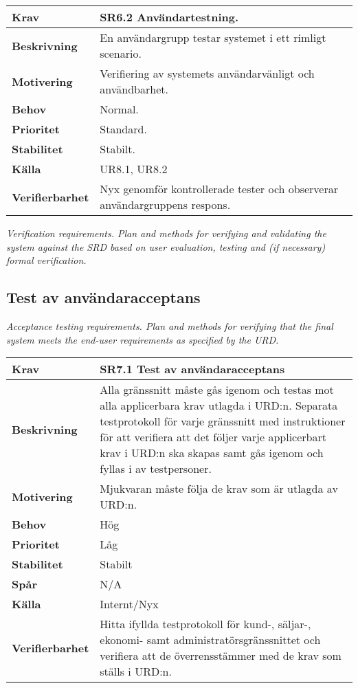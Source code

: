 \documentclass[a4paper, twoside, 11pt, titlepage]{article}
\begin{document}
\begin{tabular} { p{2.6cm} p{12.5cm} }
	\hline
	\sffamily\textbf{Krav} & \sffamily\textbf{SR6.2 Användartestning. } \\
	\hline
	\sffamily\textbf{Beskrivning} &  En användargrupp testar systemet i ett rimligt scenario.  \\
	\hline
	\sffamily\textbf{Motivering} &  Verifiering av systemets användarvänligt och användbarhet.  \\
	\hline
	\sffamily\textbf{Behov} &  Normal.  \\
	\hline
	\sffamily\textbf{Prioritet} &  Standard.  \\
	\hline
	\sffamily\textbf{Stabilitet} &  Stabilt.  \\
	\hline
	\sffamily\textbf{Källa} &  UR8.1, UR8.2  \\
	\hline
	\sffamily\textbf{Verifierbarhet} &  Nyx genomför kontrollerade tester och observerar användargruppens respons.  \\
	\hline
\end{tabular}
\vspace{6mm}

\emph{Verification requirements. Plan and methods for verifying and validating the system against the SRD based on user evaluation, testing and (if necessary) formal verification.}

	\subsection{Test av användaracceptans}


	\emph{Acceptance testing requirements. Plan and methods for verifying that the final system meets the end-user requirements as specified by the URD.}

	\begin{tabular} { p{2.6cm} p{12.5cm} }
		\hline
		\sffamily\textbf{Krav} & \sffamily\textbf{SR7.1 Test av användaracceptans } \\
		\hline
		\sffamily\textbf{Beskrivning} & Alla gränssnitt måste gås igenom och testas mot alla applicerbara krav utlagda i URD:n. Separata testprotokoll för varje gränssnitt med instruktioner för att verifiera att det följer varje applicerbart krav i URD:n ska skapas samt gås igenom och fyllas i av testpersoner.  \\
		\hline
		\sffamily\textbf{Motivering} & Mjukvaran måste följa de krav som är utlagda av URD:n.  \\
		\hline
		\sffamily\textbf{Behov} & Hög  \\
		\hline
		\sffamily\textbf{Prioritet} & Låg  \\
		\hline
		\sffamily\textbf{Stabilitet} & Stabilt  \\
		\hline
		\sffamily\textbf{Spår} & N/A  \\
		\hline
		\sffamily\textbf{Källa} & Internt/Nyx  \\
		\hline
		\sffamily\textbf{Verifierbarhet} & Hitta ifyllda testprotokoll för kund-, säljar-, ekonomi- samt administratörsgränssnittet och verifiera att de överrensstämmer med de krav som ställs i URD:n.  \\
		\hline
	\end{tabular}
	\vspace{6mm}
\end{document}
